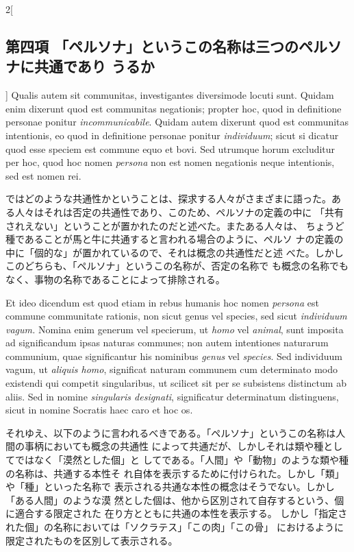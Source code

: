 \documentclass[paper=a4paper,fontsize=10pt,jafontsize=9pt,titlepage]{jlreq}
\begin{document}
\begin{paracol}{2}[\subsection{第四項 「ペルソナ」というこの名称は三つのペルソナに共通であり うるか}]
Qualis autem sit communitas, investigantes diversimode locuti
sunt. Quidam enim dixerunt quod est communitas negationis; propter
hoc, quod in definitione personae ponitur {\itshape incommunicabile}. Quidam
autem dixerunt quod est communitas intentionis, eo quod in definitione
personae ponitur {\itshape individuum}; sicut si dicatur quod esse speciem est
commune equo et bovi. Sed utrumque horum excluditur per hoc, quod hoc
nomen {\itshape persona} non est nomen negationis neque intentionis, sed est
nomen rei.


\switchcolumn


ではどのような共通性かということは、探求する人々がさまざまに語った。あ
 る人々はそれは否定の共通性であり、このため、ペルソナの定義の中に
 「共有されえない」ということが置かれたのだと述べた。またある人々は、
 ちょうど種であることが馬と牛に共通すると言われる場合のように、ペルソ
 ナの定義の中に「個的な」が置かれているので、それは概念の共通性だと述
 べた。しかしこのどちらも、「ペルソナ」というこの名称が、否定の名称で
 も概念の名称でもなく、事物の名称であることによって排除される。


\switchcolumn*


Et ideo dicendum est quod etiam in rebus humanis hoc nomen
{\itshape persona} est commune communitate rationis, non sicut genus vel species,
sed sicut {\itshape individuum vagum.} Nomina enim generum vel specierum, ut {\itshape homo}
vel {\itshape animal}, sunt imposita ad significandum ipsas naturas communes; non
autem intentiones naturarum communium, quae significantur his
nominibus {\itshape genus} vel {\itshape species}. Sed individuum vagum, ut {\itshape aliquis homo},
significat naturam communem cum determinato modo existendi qui
competit singularibus, ut scilicet sit per se subsistens distinctum ab
aliis. 
Sed in nomine {\itshape singularis designati}, significatur determinatum
distinguens, sicut in nomine Socratis haec caro et hoc os.


\switchcolumn


それゆえ、以下のように言われるべきである。「ペルソナ」というこの名称は人間の事柄においても概念の共通性
 によって共通だが、しかしそれは類や種としてではなく「漠然とした個」と
 してである。「人間」や「動物」のような類や種の名称は、共通する本性そ
 れ自体を表示するために付けられた。しかし「類」や「種」といった名称で
 表示される共通な本性の概念はそうでない。しかし「ある人間」のような漠
 然とした個は、他から区別されて自存するという、個に適合する限定された
 在り方とともに共通の本性を表示する。
しかし「指定された個」の名称においては「ソクラテス」「この肉」「この骨」
におけるように限定されたものを区別して表示される。



\end{paracol}
\end{document}
